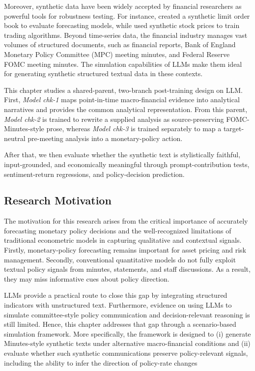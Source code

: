 Moreover, synthetic data have been widely accepted by financial researchers as powerful tools for robustness testing. For instance, \cite{cao2022synthetic} created a synthetic limit order book to evaluate forecasting models, while \cite{carvajal2022synthetic} used synthetic stock prices to train trading algorithms. Beyond time-series data, the financial industry manages vast volumes of structured documents, such as financial reports, Bank of England Monetary Policy Committee (MPC) meeting minutes, and Federal Reserve FOMC meeting minutes. The simulation capabilities of LLMs make them ideal for generating synthetic structured textual data in these contexts.


This chapter studies a shared-parent, two-branch post-training design on LLM. First, \textit{Model chk-1} maps point-in-time macro-financial evidence into analytical narratives and provides the common analytical representation. From this parent, \textit{Model chk-2} is trained to rewrite a supplied analysis as source-preserving FOMC-Minutes-style prose, whereas \textit{Model chk-3} is trained separately to map a target-neutral pre-meeting analysis into a monetary-policy action.

After that, we then evaluate whether the synthetic text is stylistically faithful, input-grounded, and economically meaningful through prompt-contribution tests, sentiment-return regressions, and policy-decision prediction.



\subsection*{Research Motivation}

The motivation for this research arises from the critical importance of accurately forecasting monetary policy decisions and the well-recognized limitations of traditional econometric models in capturing qualitative and contextual signals. Firstly, monetary-policy forecasting remains important for asset pricing and risk management. Secondly, conventional quantitative models do not fully exploit textual policy signals from minutes, statements, and staff discussions. As a result, they may miss informative cues about policy direction.


LLMs provide a practical route to close this gap by integrating structured
indicators with unstructured text. Furthermore, evidence on using LLMs to simulate committee-style policy communication and decision-relevant reasoning is still limited. Hence, this chapter addresses that gap through a scenario-based simulation framework. More specifically, the framework is designed to (i) generate Minutes-style synthetic texts under alternative macro-financial conditions and (ii) evaluate whether such synthetic communications preserve policy-relevant signals, including the ability to infer the direction of policy-rate changes



